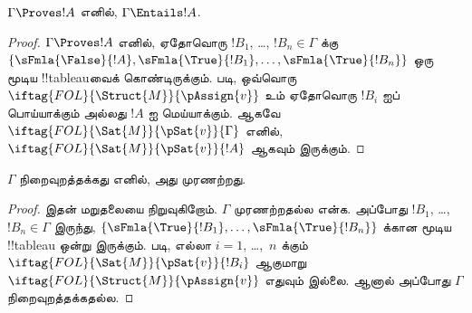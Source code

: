 \documentclass[../../../include/open-logic-section]{subfiles}
\begin{document}
\begin{cor}
$\Gamma \Proves !A$ எனில், $\Gamma \Entails !A$.
\end{cor}

\begin{proof}
  $\Gamma \Proves !A$ எனில், ஏதோவொரு $!B_1$, \dots, $!B_n \in
  \Gamma$ க்கு $\{\sFmla{\False}{!A}, \sFmla{\True}{!B_1}, \dots,
  \sFmla{\True}{!B_n}\}$ ஒரு மூடிய !!{tableau}வைக் கொண்டிருக்கும்.
   படி, ஒவ்வொரு
  ~$\iftag{FOL}{\Struct{M}}{\pAssign{v}}$
  உம் ஏதோவொரு $!B_i$ ஐப் பொய்யாக்கும் அல்லது $!A$ ஐ மெய்யாக்கும். ஆகவே
  $\iftag{FOL}{\Sat{M}}{\pSat{v}}{\Gamma}$ எனில்,
  $\iftag{FOL}{\Sat{M}}{\pSat{v}}{!A}$ ஆகவும் இருக்கும்.
\end{proof}

\begin{cor}
$\Gamma$ நிறைவுறத்தக்கது எனில், அது முரணற்றது.
\end{cor}

\begin{proof}
இதன் மறுதலையை நிறுவுகிறோம். $\Gamma$ முரணற்றதல்ல என்க. அப்போது
$!B_1$, \dots, $!B_n \in \Gamma$ இருந்து,
$\{\sFmla{\True}{!B_1}, \dots, \sFmla{\True}{!B_n}\}$ க்கான மூடிய
!!{tableau} ஒன்று இருக்கும்.  படி, எல்லா
$i=1$, \dots,~$n$ க்கும் $\iftag{FOL}{\Sat{M}}{\pSat{v}}{!B_i}$ ஆகுமாறு
$\iftag{FOL}{\Struct{M}}{\pAssign{v}}$ எதுவும் இல்லை. ஆனால் அப்போது
$\Gamma$ நிறைவுறத்தக்கதல்ல.
\end{proof}
\end{document}
